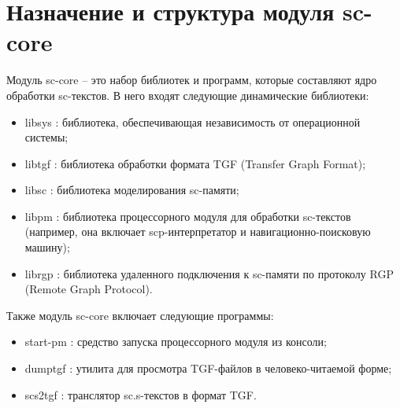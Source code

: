 \section{Назначение и структура модуля sc-core}

Модуль sc-core – это набор библиотек и программ, которые составляют
ядро обработки sc-текстов. В него входят следующие динамические
библиотеки:
\begin{itemize}
\item libsys : библиотека, обеспечивающая независимость от
  операционной системы;
\item libtgf : библиотека обработки формата TGF (Transfer Graph Format);
\item libsc : библиотека моделирования sc-памяти;
\item libpm : библиотека процессорного модуля для обработки sc-текстов
  (например, она включает scp-интерпретатор и навигационно-поисковую
  машину);
\item librgp : библиотека удаленного подключения к sc-памяти по
  протоколу RGP (Remote Graph Protocol).
\end{itemize}

Также модуль sc-core включает следующие программы:
\begin{itemize}
\item start-pm : средство запуска процессорного модуля из консоли;
\item dumptgf : утилита для просмотра TGF-файлов в человеко-читаемой
  форме;
\item scs2tgf : транслятор sc.s-текстов в формат TGF.
\end{itemize}

